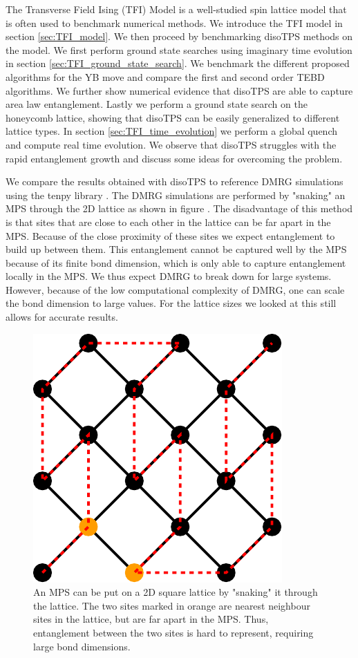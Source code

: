 The Transverse Field Ising (TFI) Model is a well-studied spin lattice model that is often used to benchmark numerical methods. We introduce the TFI model in section \ref{sec:TFI_model}. We then proceed by benchmarking disoTPS methods on the model. We first perform ground state searches using imaginary time evolution in section \ref{sec:TFI_ground_state_search}. We benchmark the different proposed algorithms for the YB move and compare the first and second order TEBD algorithms. We further show numerical evidence that disoTPS are able to capture area law entanglement. Lastly we perform a ground state search on the honeycomb lattice, showing that disoTPS can be easily generalized to different lattice types. In section \ref{sec:TFI_time_evolution} we perform a global quench and compute real time evolution. We observe that disoTPS struggles with the rapid entanglement growth and discuss some ideas for overcoming the problem. \par
We compare the results obtained with disoTPS to reference DMRG simulations using the tenpy library \cite{cite:tenpy}. The DMRG simulations are performed by "snaking" an MPS through the 2D lattice as shown in figure . The disadvantage of this method is that sites that are close to each other in the lattice can be far apart in the MPS. Because of the close proximity of these sites we expect entanglement to build up between them. This entanglement cannot be captured well by the MPS because of its finite bond dimension, which is only able to capture entanglement locally in the MPS. We thus expect DMRG to break down for large systems. However, because of the low computational complexity of DMRG, one can scale the bond dimension to large values. For the lattice sizes we looked at this still allows for accurate results.
\begin{figure}
	\centering
	\includegraphics[scale=0.6]{figures/tikz/TFI/dmrg_snaking/dmrg_snaking.pdf}
	\caption{An MPS can be put on a 2D square lattice by "snaking" it through the lattice. The two sites marked in orange are nearest neighbour sites in the lattice, but are far apart in the MPS. Thus, entanglement between the two sites is hard to represent, requiring large bond dimensions.}
	\label{fig:tenpy_snaking}
\end{figure}

